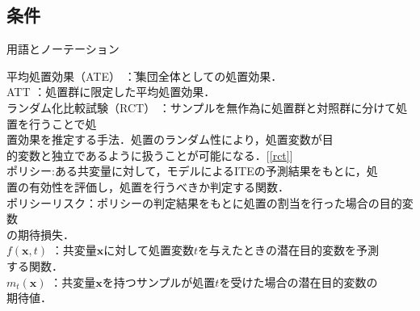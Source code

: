 \documentclass[dvipdfmx]{jreport}
\begin{document}
\subsection{条件} \label{実験条件}
\begin{itembox}[l]{\large{用語とノーテーション}}
    \begin{tabbing}
        \hspace{15pt} \raisebox{0.5ex}{\tiny $\bullet$} 平均処置効果（ATE） \hspace{22pt}\=：集団全体としての処置効果．\\[0.5em]
        \hspace{15pt} \raisebox{0.5ex}{\tiny $\bullet$} ATT \>：処置群に限定した平均処置効果．\\[0.5em]
        \hspace{15pt} \raisebox{0.5ex}{\tiny $\bullet$} ランダム化比較試験（RCT） \>：サンプルを無作為に処置群と対照群に分けて処置を行うことで処\\[0.5em]\>\hspace{6.5pt}置効果を推定する手法．処置のランダム性により，処置変数が目\\[0.5em]\>\hspace{6.5pt}的変数と独立であるように扱うことが可能になる．[\ref{rct}]\\[0.5em]
        \hspace{15pt} \raisebox{0.5ex}{\tiny $\bullet$} ポリシー\>:ある共変量に対して，モデルによるITEの予測結果をもとに，処\\[0.5em]\>\hspace{6.5pt}置の有効性を評価し，処置を行うべきか判定する関数．\\[0.5em]
        \hspace{15pt} \raisebox{0.5ex}{\tiny $\bullet$} ポリシーリスク\>：ポリシーの判定結果をもとに処置の割当を行った場合の目的変数\\[0.5em]\>\hspace{6.5pt}の期待損失．\\[0.5em]
        \hspace{15pt} \raisebox{0.5ex}{\tiny $\bullet$} $f(\boldsymbol{x}, t)$ \> ：共変量$\boldsymbol{x}$に対して処置変数$t$を与えたときの潜在目的変数を予測\\[0.5em]\>\hspace{6.5pt}する関数．\\[0.5em]
        \hspace{15pt} \raisebox{0.5ex}{\tiny $\bullet$} $m_t(\boldsymbol{x})$ \> ：共変量$\boldsymbol{x}$を持つサンプルが処置$t$を受けた場合の潜在目的変数の\\[0.5em]\>\hspace{6.5pt}期待値．\\[0.5em]

\end{tabbing}
\end{itembox}
\end{document}
